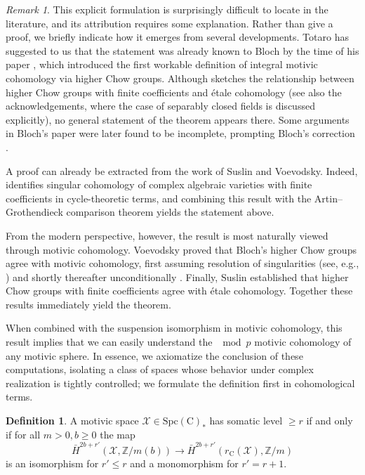 \documentclass[11pt,leqno]{article}
\newcommand{\C}{{\mathrm C}}
\newcommand{\Z}{{\mathbb Z}}
\renewcommand{\1}{{\rm 1\hspace*{-0.4ex}%
\rule{0.1ex}{1.52ex}\hspace*{0.2ex}}}
\newcommand{\Spc}{\mathrm{Spc}}
\newcommand{\<}[1]{{\langle}#1 {\rangle}}
\newcounter{intro}
\theoremstyle{plain}
\theoremstyle{definition}
\newtheorem{defn}[theorem]{Definition}
\theoremstyle{remark}
\newtheorem{rem}[theorem]{Remark}
\numberwithin{equation}{subsection}
\begin{document}
\begin{rem}
This explicit formulation is surprisingly difficult to locate in the literature, and its attribution requires some explanation. Rather than give a proof, we briefly indicate how it emerges from several developments.  Totaro has suggested to us that the statement was already known to Bloch by the time of his paper \cite{Bloch1986}, which introduced the first workable definition of integral motivic cohomology via higher Chow groups. Although \cite[\S 11]{Bloch1986} sketches the relationship between higher Chow groups with finite coefficients and étale cohomology (see also the acknowledgements, where the case of separably closed fields is discussed explicitly), no general statement of the theorem appears there. Some arguments in Bloch's paper were later found to be incomplete, prompting Bloch's correction \cite{Bloch1994}.

A proof can already be extracted from the work of Suslin and Voevodsky. Indeed, \cite[Theorem 8.3]{SuslinVoevodsky1996} identifies singular cohomology of complex algebraic varieties with finite coefficients in cycle-theoretic terms, and combining this result with the Artin--Grothendieck comparison theorem yields the statement above.

From the modern perspective, however, the result is most naturally viewed through motivic cohomology. Voevodsky proved that Bloch's higher Chow groups agree with motivic cohomology, first assuming resolution of singularities (see, e.g., \cite[Theorem 19.1]{MVW}) and shortly thereafter unconditionally \cite[Corollary 2]{Voevodsky2002HigherChow}. Finally, Suslin established \cite[Corollary 4.3]{Suslin2011HigherChow} that higher Chow groups with finite coefficients agree with étale cohomology. Together these results immediately yield the theorem.
\end{rem}

When combined with the suspension isomorphism in motivic cohomology, this result implies that we can easily understand the $\mod p$ motivic cohomology of any motivic sphere.  In essence, we axiomatize the conclusion of these computations, isolating a class of spaces whose behavior under complex realization is tightly controlled; we formulate the definition first in cohomological terms.

\begin{defn}
	\label{defn:somaticlevel}
	A motivic space $\mathscr{X} \in \Spc(\C)_*$ has somatic level $\geq r$ if and only if for all $m > 0, b \ge 0$ the map \[ \bar H^{2b+r'}(\mathscr{X}, \Z/m(b)) \longrightarrow \bar H^{2b+r'}(r_\C(\mathscr{X}), \Z/m) \] is an isomorphism for $r' \le r$ and a monomorphism for $r'=r+1$.	
\end{defn}	
\end{document}
